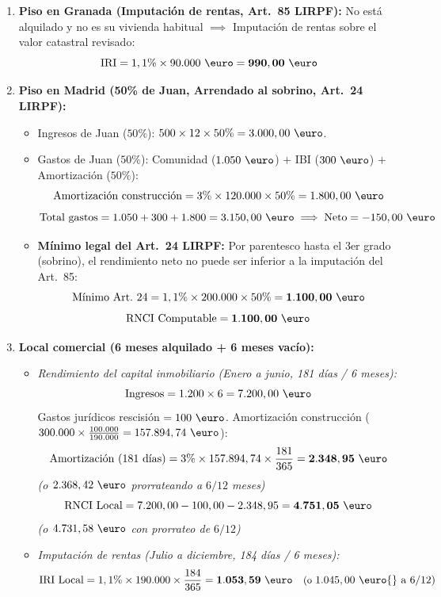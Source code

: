 \documentclass[11pt,a4paper,openany]{article}
\begin{document}
\begin{solucionBox}
\begin{enumerate}[label=\alph*.]
    \item \textbf{Piso en Granada (Imputación de rentas, Art.~85 LIRPF):}
    No está alquilado y no es su vivienda habitual $\implies$ Imputación de rentas sobre el valor catastral revisado:
    $$\mathbf{\text{IRI}} = 1,1\% \times 90.000\text{ \euro} = \mathbf{990,00\text{ \euro}}$$

    \item \textbf{Piso en Madrid (50\% de Juan, Arrendado al sobrino, Art.~24 LIRPF):}
    \begin{itemize}
        \item Ingresos de Juan ($50\%$): $500 \times 12 \times 50\% = 3.000,00\text{ \euro}$.
        \item Gastos de Juan ($50\%$): Comunidad ($1.050\text{ \euro}$) $+$ IBI ($300\text{ \euro}$) $+$ Amortización ($50\%$):
        $$\text{Amortización construcción} = 3\% \times 120.000 \times 50\% = 1.800,00\text{ \euro}$$
        $$\text{Total gastos} = 1.050 + 300 + 1.800 = 3.150,00\text{ \euro} \implies \text{Neto} = -150,00\text{ \euro}$$
        \item \textbf{Mínimo legal del Art.~24 LIRPF:} Por parentesco hasta el 3er grado (sobrino), el rendimiento neto no puede ser inferior a la imputación del Art.~85:
        $$\text{Mínimo Art.~24} = 1,1\% \times 200.000 \times 50\% = \mathbf{1.100,00\text{ \euro}}$$
        $$\mathbf{\text{RNCI Computable}} = \mathbf{1.100,00\text{ \euro}}$$
    \end{itemize}

    \item \textbf{Local comercial (6 meses alquilado + 6 meses vacío):}
    \begin{itemize}
        \item \textit{Rendimiento del capital inmobiliario (Enero a junio, 181 días / 6 meses):}
        $$\text{Ingresos} = 1.200 \times 6 = 7.200,00\text{ \euro}$$
        Gastos jurídicos rescisión $= 100\text{ \euro}$. Amortización construcción ($300.000 \times \frac{100.000}{190.000} = 157.894,74\text{ \euro}$):
        $$\text{Amortización (181 días)} = 3\% \times 157.894,74 \times \frac{181}{365} = \mathbf{2.348,95\text{ \euro}}$$
        \textit{(o $2.368,42\text{ \euro}$ prorrateando a $6/12$ meses)}
        $$\mathbf{\text{RNCI Local}} = 7.200,00 - 100,00 - 2.348,95 = \mathbf{4.751,05\text{ \euro}}$$
        \textit{(o $4.731,58\text{ \euro}$ con prorrateo de $6/12$)}
        \item \textit{Imputación de rentas (Julio a diciembre, 184 días / 6 meses):}
        $$\mathbf{\text{IRI Local}} = 1,1\% \times 190.000 \times \frac{184}{365} = \mathbf{1.053,59\text{ \euro}} \quad \text{\small(o } 1.045,00\text{ \euro{} a 6/12)}$$
    \end{itemize}
\end{enumerate}
\end{solucionBox}
\end{document}
